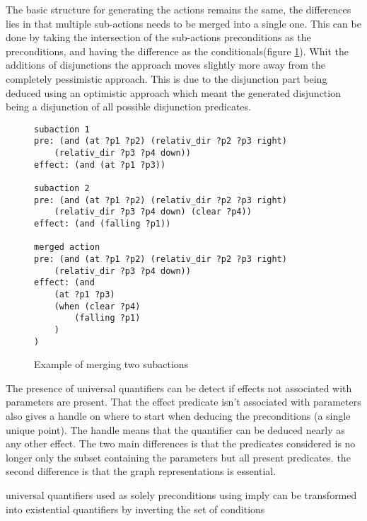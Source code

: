 	The basic structure for generating the actions remains the same, the differences lies in that multiple sub-actions needs to be merged into a single one. This can be done by taking the intersection of the sub-actions preconditions as the preconditions, and having the difference as the conditionals(figure \ref{merge}). Whit the additions of disjunctions the approach moves slightly more away from the completely pessimistic approach. This is due to the disjunction part being deduced using an optimistic approach which meant the generated disjunction being a disjunction of all possible disjunction predicates.
\begin{figure}
	\caption{Example of merging two subactions}
	\label{merge}
		\begin{lstlisting}
subaction 1
pre: (and (at ?p1 ?p2) (relativ_dir ?p2 ?p3 right) 
	(relativ_dir ?p3 ?p4 down))
effect: (and (at ?p1 ?p3))
		
subaction 2
pre: (and (at ?p1 ?p2) (relativ_dir ?p2 ?p3 right) 
	(relativ_dir ?p3 ?p4 down) (clear ?p4))
effect: (and (falling ?p1))
		
merged action
pre: (and (at ?p1 ?p2) (relativ_dir ?p2 ?p3 right) 
	(relativ_dir ?p3 ?p4 down))
effect: (and 
	(at ?p1 ?p3)
	(when (clear ?p4) 
		(falling ?p1)
	)
)
\end{lstlisting}
\end{figure}	

	
	
	


	The presence of universal quantifiers can be detect if effects not associated with parameters are present. That the effect predicate isn't associated with parameters also gives a handle on where to start when deducing the preconditions (a single unique point). The handle means that the quantifier can be deduced nearly as any other effect. The two main differences is that the predicates considered is no longer only the subset containing the parameters but all present predicates. the second  difference is that the graph representations is essential. 
	
	
	universal quantifiers used as solely preconditions using imply can be transformed into existential quantifiers by inverting the set of conditions
